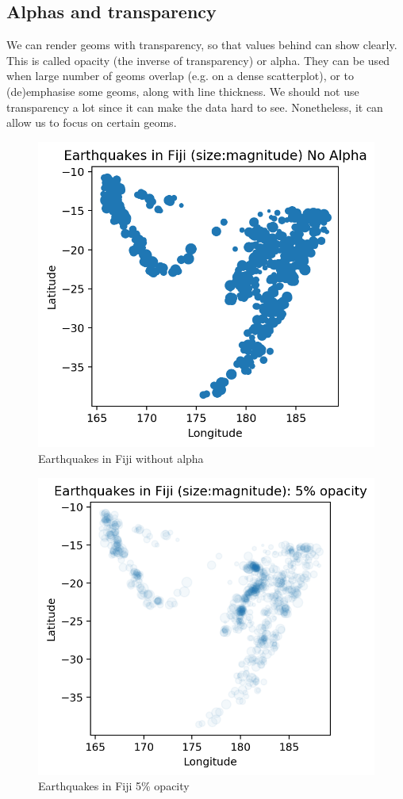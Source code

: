 \documentclass[a4paper, openany]{memoir}
\begin{document}
\subsection{Alphas and transparency}
We can render geoms with transparency, so that values behind can show clearly. This is called opacity (the inverse of transparency) or alpha. They can be used when large number of geoms overlap (e.g. on a dense scatterplot), or to (de)emphasise some geoms, along with line thickness. We should not use transparency a lot since it can make the data hard to see. Nonetheless, it can allow us to focus on certain geoms.
\begin{figure}[H]
    \centering
    \includegraphics[scale=0.6]{src/2.51 Fiji Example Plot 4.png}
    \caption{Earthquakes in Fiji without alpha}
\end{figure}
\begin{figure}[H]
    \centering
    \includegraphics[scale=0.6]{src/2.52 Fiji example Plot 5.png}
    \caption{Earthquakes in Fiji 5\% opacity}
\end{figure}
\end{document}
